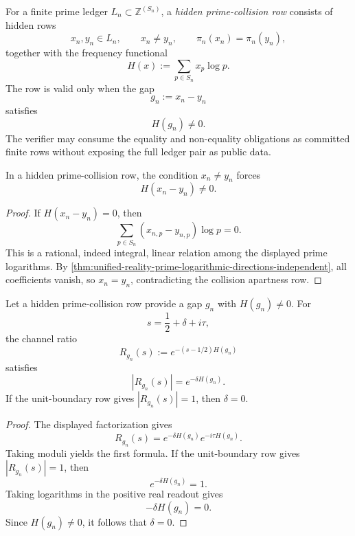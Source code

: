 \begin{definition}
\label{def:unified-reality-hidden-prime-collision-row}
For a finite prime ledger $L_n\subset\mathbb Z^{(S_n)}$, a
\emph{hidden prime-collision row} consists of hidden rows
$$
x_n,y_n\in L_n,
\qquad
x_n\ne y_n,
\qquad
\pi_n(x_n)=\pi_n(y_n),
$$
together with the frequency functional
$$
H(x):=\sum_{p\in S_n}x_p\log p.
$$
The row is valid only when the gap
$$
g_n:=x_n-y_n
$$
satisfies
$$
H(g_n)\ne0.
$$
The verifier may consume the equality and non-equality obligations as
committed finite rows without exposing the full ledger pair as public
data.
\end{definition}

\begin{lemma}
\label{lem:unified-reality-prime-collisions-expose-nonzero-frequency-gap}
In a hidden prime-collision row, the condition $x_n\ne y_n$ forces
$$
H(x_n-y_n)\ne0.
$$
\end{lemma}

\begin{proof}
If $H(x_n-y_n)=0$, then
$$
\sum_{p\in S_n}(x_{n,p}-y_{n,p})\log p=0.
$$
This is a rational, indeed integral, linear relation among the displayed
prime logarithms.  By
\autoref{thm:unified-reality-prime-logarithmic-directions-independent},
all coefficients vanish, so $x_n=y_n$, contradicting the collision
apartness row.
\end{proof}

\begin{theorem}
\label{thm:unified-reality-hidden-collision-unit-boundary-kills-real-scale}
Let a hidden prime-collision row provide a gap $g_n$ with $H(g_n)\ne0$.
For
$$
s=\frac12+\delta+i\tau,
$$
the channel ratio
$$
R_{g_n}(s):=e^{-(s-1/2)H(g_n)}
$$
satisfies
$$
|R_{g_n}(s)|=e^{-\delta H(g_n)}.
$$
If the unit-boundary row gives $|R_{g_n}(s)|=1$, then $\delta=0$.
\end{theorem}

\begin{proof}
The displayed factorization gives
$$
R_{g_n}(s)
=
e^{-\delta H(g_n)}e^{-i\tau H(g_n)}.
$$
Taking moduli yields the first formula.  If the unit-boundary row gives
$|R_{g_n}(s)|=1$, then
$$
e^{-\delta H(g_n)}=1.
$$
Taking logarithms in the positive real readout gives
$$
-\delta H(g_n)=0.
$$
Since $H(g_n)\ne0$, it follows that $\delta=0$.
\end{proof}

